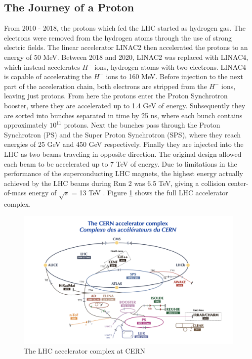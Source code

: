  \subsection{The Journey of a Proton}
 \label{sec:proton_journey}
From 2010 - 2018, the protons which fed the LHC started as hydrogen gas. The electrons were removed from the hydrogen atoms through the use of strong electric fields. The linear accelerator LINAC2 then accelerated the protons to an energy of 50 MeV. Between 2018 and 2020, LINAC2 was replaced with LINAC4, which instead accelerates $H^{-}$ ions, hydrogen atoms with two electrons. LINAC4 is capable of accelerating the $H^-$ ions to 160 MeV. Before injection to the next part of the acceleration chain, both electrons are stripped from the $H^-$ ions, leaving just protons. From here the protons enter the Proton Synchrotron booster, where they are accelerated up to 1.4 GeV of energy. Subsequently they are sorted into bunches separated in time by 25 ns, where each bunch contains approximately $10^{11}$ protons. Next the bunches pass through the Proton Synchrotron (PS) and the Super Proton Synchrotron (SPS), where they reach energies of 25 GeV and 450 GeV respectively. Finally they are injected into the LHC as two beams traveling in opposite direction. The original design allowed each beam to be accelerated up to 7 TeV of energy. Due to limitations in the performance of the superconducting LHC magnets, the highest energy actually achieved by the LHC beams during Run 2 was 6.5 TeV, giving a collision center-of-mass energy of $\sqrt{s}$ = 13 TeV \cite{lhc_faq}. Figure \ref{fig:accelerator_complex} shows the full LHC accelerator complex.\par

\begin{figure}
	\includegraphics[width=\textwidth]{figures/ch2/accelerator_complex.png}
	\caption{The LHC accelerator complex at CERN \cite{cern_accelerator_complex}}
	\label{fig:accelerator_complex}
\end{figure}


